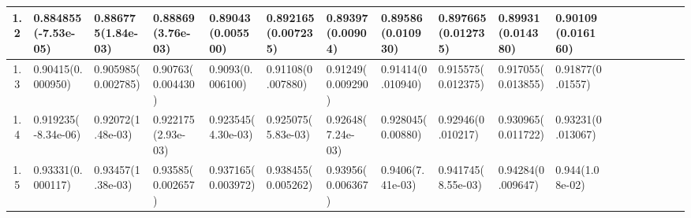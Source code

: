 \documentclass[
	article,			%
	12pt,				%
	twoside,			%
	a4paper,			%
	english,			%
	brazil,				%
	]{abntex2}
\begin{document}
\begin{landscape}
\begin{table}
\begin{tabular}{c||p{18mm}|p{18mm}|p{18mm}|p{18mm}|p{18mm}|p{18mm}|p{18mm}|p{18mm}|p{18mm}|p{18mm}|p{18mm}|p{18mm}|p{18mm}|p{18mm}|p{18mm}|p{18mm}|p{18mm}}
    			1.2& 0.884855\newline(-7.53e-05)&0.886775\newline(1.84e-03)&0.88869\newline(3.76e-03)&0.89043\newline(0.005500)&0.892165\newline(0.007235)&0.89397\newline(0.00904)&0.89586\newline(0.010930)&0.897665\newline(0.012735)&0.89931\newline(0.014380)&0.90109\newline(0.016160)\\
\hline
    			1.3 & 0.90415\newline(0.000950)&0.905985\newline(0.002785)&0.90763\newline(0.004430)&0.9093\newline(0.006100)&0.91108\newline(0.007880)&0.91249\newline(0.009290)&0.91414\newline(0.010940)&0.915575\newline(0.012375)&0.917055\newline(0.013855)&0.91877\newline(0.01557)\\
    			\hline
    			1.4 & 0.919235\newline(-8.34e-06)&0.92072\newline(1.48e-03)&0.922175\newline(2.93e-03)&0.923545\newline(4.30e-03)&0.925075\newline(5.83e-03)&0.92648\newline(7.24e-03)&0.928045\newline(0.00880)&0.92946\newline(0.010217)&0.930965\newline(0.011722)&0.93231\newline(0.013067)\\
    			\hline
    			1.5 & 0.93331\newline(0.000117)&0.93457\newline(1.38e-03)&0.93585\newline(0.002657)&0.937165\newline(0.003972)&0.938455\newline(0.005262)&0.93956\newline(0.006367)&0.9406\newline(7.41e-03)&0.941745\newline(8.55e-03)&0.94284\newline(0.009647)&0.944\newline(1.08e-02)\\

\end{tabular}
\end{table}
\end{landscape}
\end{document}

